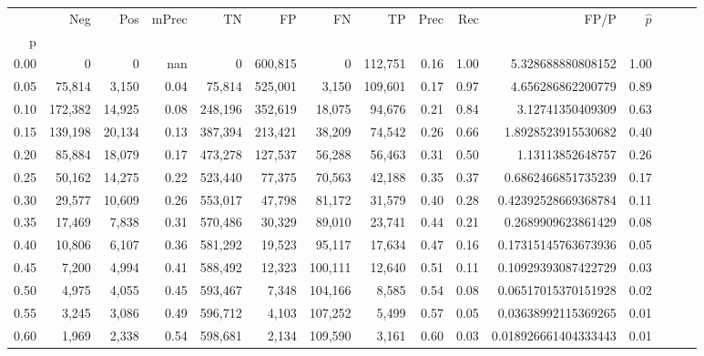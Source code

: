 \begin{tabular}{rrrrrrrrrrrrrrr}
\toprule
{} &      Neg &     Pos & mPrec &       TN &       FP &       FN &       TP &  Prec &   Rec &                   FP/P & $\hat{p}$ \\
p    &          &         &       &          &          &          &          &       &       &                        &           \\
\midrule
0.00 &        0 &       0 &   nan &        0 &  600,815 &        0 &  112,751 &  0.16 &  1.00 &      5.328688880808152 &      1.00 \\
0.05 &   75,814 &   3,150 &  0.04 &   75,814 &  525,001 &    3,150 &  109,601 &  0.17 &  0.97 &      4.656286862200779 &      0.89 \\
0.10 &  172,382 &  14,925 &  0.08 &  248,196 &  352,619 &   18,075 &   94,676 &  0.21 &  0.84 &       3.12741350409309 &      0.63 \\
0.15 &  139,198 &  20,134 &  0.13 &  387,394 &  213,421 &   38,209 &   74,542 &  0.26 &  0.66 &     1.8928523915530682 &      0.40 \\
0.20 &   85,884 &  18,079 &  0.17 &  473,278 &  127,537 &   56,288 &   56,463 &  0.31 &  0.50 &       1.13113852648757 &      0.26 \\
0.25 &   50,162 &  14,275 &  0.22 &  523,440 &   77,375 &   70,563 &   42,188 &  0.35 &  0.37 &     0.6862466851735239 &      0.17 \\
0.30 &   29,577 &  10,609 &  0.26 &  553,017 &   47,798 &   81,172 &   31,579 &  0.40 &  0.28 &    0.42392528669368784 &      0.11 \\
0.35 &   17,469 &   7,838 &  0.31 &  570,486 &   30,329 &   89,010 &   23,741 &  0.44 &  0.21 &     0.2689909623861429 &      0.08 \\
0.40 &   10,806 &   6,107 &  0.36 &  581,292 &   19,523 &   95,117 &   17,634 &  0.47 &  0.16 &    0.17315145763673936 &      0.05 \\
0.45 &    7,200 &   4,994 &  0.41 &  588,492 &   12,323 &  100,111 &   12,640 &  0.51 &  0.11 &    0.10929393087422729 &      0.03 \\
0.50 &    4,975 &   4,055 &  0.45 &  593,467 &    7,348 &  104,166 &    8,585 &  0.54 &  0.08 &    0.06517015370151928 &      0.02 \\
0.55 &    3,245 &   3,086 &  0.49 &  596,712 &    4,103 &  107,252 &    5,499 &  0.57 &  0.05 &    0.03638992115369265 &      0.01 \\
0.60 &    1,969 &   2,338 &  0.54 &  598,681 &    2,134 &  109,590 &    3,161 &  0.60 &  0.03 &   0.018926661404333443 &      0.01 \\

\end{tabular}

